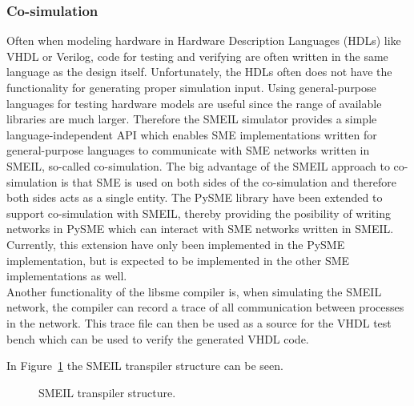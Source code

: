 \subsubsection{Co-simulation}
Often when modeling hardware in Hardware Description Languages (HDLs) like VHDL or Verilog, code for testing and verifying are often written in the same language as the design itself. Unfortunately, the HDLs often does not have the functionality for generating proper simulation input. Using general-purpose languages for testing hardware models are useful since the range of available libraries are much larger.
Therefore the SMEIL simulator provides a simple language-independent API which enables SME implementations written for general-purpose languages to communicate with SME networks written in SMEIL, so-called co-simulation.
The big advantage of the SMEIL approach to co-simulation is that SME is used on both sides of the co-simulation and therefore both sides acts as a single entity.
The PySME %
library have been extended to support co-simulation with SMEIL, thereby providing the posibility of writing networks in PySME which can interact with SME networks written in SMEIL. Currently, this extension have only been implemented in the PySME implementation, but is expected to be implemented in the other SME implementations as well.\\
Another functionality of the libsme compiler is, when simulating the SMEIL network, the compiler can record a trace of all communication between processes in the network. This trace file can then be used as a source for the VHDL test bench which can be used to verify the generated VHDL code.

In Figure~\ref{fig:smeil_transpiler} the SMEIL transpiler structure can be seen.

\begin{figure}[!ht]
  \centering
  \caption{SMEIL transpiler structure.}
  \label{fig:smeil_transpiler}
\end{figure}




